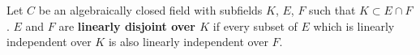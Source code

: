 Let $C$ be an algebraically closed field with subfields $K$, $E$, $F$ such that $K \subset E \cap F$.
$E$ and $F$ are \textbf{linearly disjoint over $K$} if every subset of $E$ which is linearly independent over $K$ is also linearly independent over $F$.
